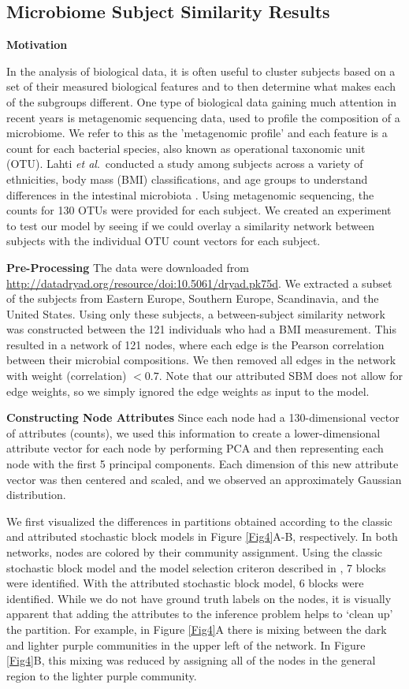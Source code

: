\documentclass[10pt,journal,compsoc]{IEEEtran}
\begin{document}
\subsection{Microbiome Subject Similarity Results}

{\bf Motivation}

In the analysis of biological data, it is often useful to cluster subjects based on a set of their measured biological features and to then determine what makes each of the subgroups different. One type of biological data gaining much attention in recent years is metagenomic sequencing data, used to profile the composition of a microbiome. We refer to this as the 'metagenomic profile' and each feature is a count for each bacterial species, also known as operational taxonomic unit (OTU). Lahti \emph{et al}.\ conducted a study among subjects across a variety of ethnicities, body mass (BMI) classifications, and age groups to understand differences in the intestinal microbiota \cite{microbiomedata}. Using metagenomic sequencing, the counts for 130 OTUs were provided for each subject. We created an experiment to test our model by seeing if we could overlay a similarity network between subjects with the individual OTU count vectors for each subject. 

{\bf Pre-Processing}
The data were downloaded from \url{http://datadryad.org/resource/doi:10.5061/dryad.pk75d}. We extracted a subset of the subjects from Eastern Europe, Southern Europe, Scandinavia, and the United States. Using only these subjects, a between-subject similarity network was constructed between the 121 individuals who had a BMI measurement. This resulted in a network of 121 nodes, where each edge is the Pearson correlation between their microbial compositions. We then removed all edges in the network with weight (correlation) $<0.7$. Note that our attributed SBM does not allow for edge weights, so we simply ignored the edge weights as input to the model.

{\bf Constructing Node Attributes}
Since each node had a 130-dimensional vector of attributes (counts), we used this information to create a lower-dimensional attribute vector for each node by performing PCA and then representing each node with the first 5 principal components. Each dimension of this new attribute vector was then centered and scaled, and we observed an approximately Gaussian distribution. 

We first visualized the differences in partitions obtained according to the classic and attributed stochastic block models in Figure \ref{Fig4}A-B, respectively. In both networks, nodes are colored by their community assignment. Using the classic stochastic block model and the model selection criteron described in \cite{dudin}, 7 blocks were identified. With the attributed stochastic block model, 6 blocks were identified. While we do not have ground truth labels on the nodes, it is visually apparent that adding the attributes to the inference problem helps to `clean up' the partition. For example, in Figure \ref{Fig4}A there is mixing between the dark and lighter purple communities in the upper left of the network. In Figure \ref{Fig4}B, this mixing was reduced by assigning all of the nodes in the general region to the lighter purple community. 
\end{document}

